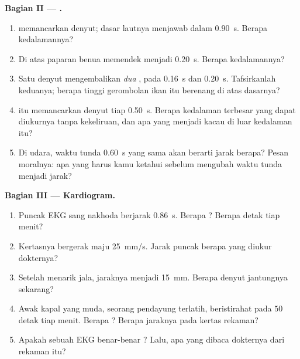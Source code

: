 \begin{problem}[{Soal akhir pekan --- membaca sinyal dunia: satu hukum,
$d = v\,t$, mengukur jarak badai, memetakan dasar laut, menghitung detak
jantung dan menyingkap cara kerja GPS}]
\medskip
\noindent\textbf{Bagian II --- .}
\begin{enumerate}[resume]
  \item {} memancarkan denyut; dasar lautnya menjawab dalam
        \qty{0.90}{s}. Berapa kedalamannya?
  \item Di atas paparan benua  memendek menjadi \qty{0.20}{s}.
        Berapa kedalamannya?
  \item Satu denyut mengembalikan \emph{dua} , pada \qty{0.16}{s}
        dan \qty{0.20}{s}. Tafsirkanlah keduanya; berapa tinggi
        gerombolan ikan itu berenang di atas dasarnya?
  \item {} itu memancarkan denyut tiap \qty{0.50}{s}. Berapa
        kedalaman terbesar yang dapat diukurnya tanpa kekeliruan, dan
        apa yang menjadi kacau di luar kedalaman itu?
  \item Di udara, waktu tunda \qty{0.60}{s} yang sama akan berarti
        jarak berapa? Pesan moralnya: apa yang harus kamu ketahui
        sebelum mengubah waktu tunda menjadi jarak?
\end{enumerate}

\medskip
\noindent\textbf{Bagian III --- Kardiogram.}
\begin{enumerate}[resume]
  \item Puncak EKG sang nakhoda berjarak \qty{0.86}{s}. Berapa
        ? Berapa detak tiap menit?
  \item Kertasnya bergerak maju \qty{25}{mm/s}. Jarak puncak berapa
        yang diukur dokternya?
  \item Setelah menarik jala, jaraknya menjadi \qty{15}{mm}. Berapa
        denyut jantungnya sekarang?
  \item Awak kapal yang muda, seorang pendayung terlatih, beristirahat
        pada $50$ detak tiap menit. Berapa ? Berapa jaraknya
        pada kertas rekaman?
  \item Apakah sebuah EKG benar-benar ? Lalu, apa yang dibaca
        dokternya dari rekaman itu?
\end{enumerate}


\end{problem}
